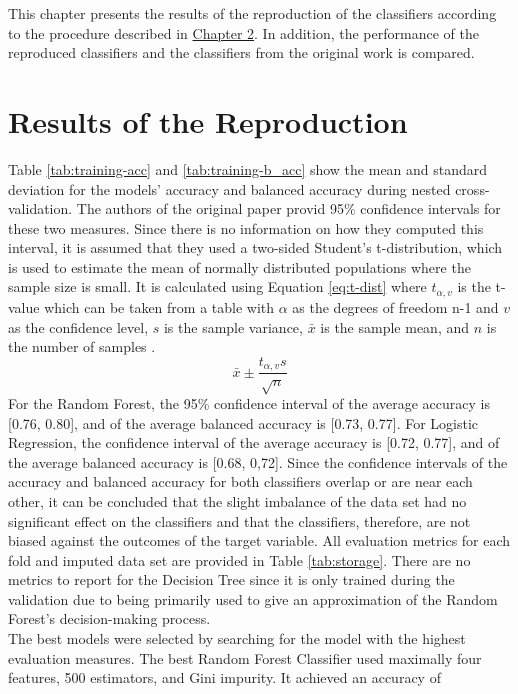 This chapter presents the results of the reproduction of the classifiers 
according to the procedure described in \hyperref[chap:methods]{Chapter 2}. In 
addition, the performance of the reproduced classifiers and the classifiers 
from the original work \cite{RN127} is compared. 
\section{Results of the Reproduction}
Table \ref{tab:training-acc} and \ref{tab:training-b_acc} show the mean and 
standard deviation for the models' accuracy and balanced accuracy during 
nested cross-validation. The authors of the original paper provid 95\% 
confidence intervals for these two measures. Since there is no information on 
how they computed this interval, it is assumed that they used a two-sided 
Student's t-distribution, which is used to estimate the mean of normally 
distributed populations where the sample size is small. It is calculated using 
Equation \ref{eq:t-dist} where 
$t_{\alpha, v}$ is the t-value which can be taken from a table with $\alpha$ 
as the degrees of freedom n-1 and $v$ as the confidence level, $s$ is the 
sample variance, $\bar{x}$ is the sample mean, and $n$ is the number of samples 
\cite{RN197}.
\begin{equation}
 \bar{x} \pm \frac{t_{\alpha, v}s}{\sqrt{n}}
 \label{eq:t-dist}
\end{equation}
For the Random Forest, the 95\% confidence interval of the average accuracy is 
[0.76, 0.80], and of the average balanced accuracy is [0.73, 0.77]. 
For Logistic Regression, the confidence interval of the average accuracy is 
[0.72, 0.77], and of the average balanced accuracy is [0.68, 0,72]. Since the 
confidence intervals of the accuracy and balanced accuracy for both classifiers 
overlap or are near each other, it can be concluded that the slight imbalance 
of the data set had no significant effect on the classifiers and that the 
classifiers, therefore, are not biased against the outcomes of the target 
variable. All evaluation metrics for each fold and imputed data set are 
provided in Table \ref{tab:storage}. There are no metrics to report for the 
Decision Tree since it is only trained during the validation due to being 
primarily used to give an approximation of the Random Forest's decision-making 
process.
\\
The best models were selected by searching for the model with the highest 
evaluation measures. The best Random Forest Classifier used 
maximally 
four features, 500 estimators, and Gini impurity. It achieved an accuracy of 
